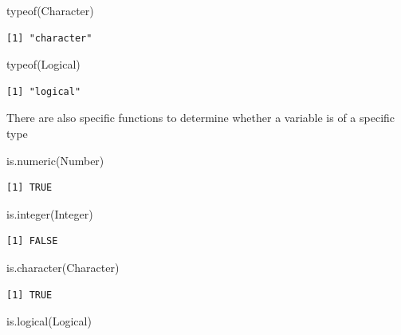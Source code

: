 \documentclass[
  letterpaper,
  DIV=11,
  numbers=noendperiod]{scrartcl}
\newenvironment{Shaded}{\begin{snugshade}}{\end{snugshade}}
\newcommand{\FunctionTok}[1]{\textcolor[rgb]{0.28,0.35,0.67}{#1}}
\newcommand{\NormalTok}[1]{\textcolor[rgb]{0.00,0.23,0.31}{#1}}
\begin{document}
\begin{Shaded}
\begin{Highlighting}[]
\FunctionTok{typeof}\NormalTok{(Character)}
\end{Highlighting}
\end{Shaded}

\begin{verbatim}
[1] "character"
\end{verbatim}

\begin{Shaded}
\begin{Highlighting}[]
\FunctionTok{typeof}\NormalTok{(Logical)}
\end{Highlighting}
\end{Shaded}

\begin{verbatim}
[1] "logical"
\end{verbatim}

There are also specific functions to determine whether a variable is of
a specific type

\begin{Shaded}
\begin{Highlighting}[]
\FunctionTok{is.numeric}\NormalTok{(Number)}
\end{Highlighting}
\end{Shaded}

\begin{verbatim}
[1] TRUE
\end{verbatim}

\begin{Shaded}
\begin{Highlighting}[]
\FunctionTok{is.integer}\NormalTok{(Integer) }
\end{Highlighting}
\end{Shaded}

\begin{verbatim}
[1] FALSE
\end{verbatim}

\begin{Shaded}
\begin{Highlighting}[]
\FunctionTok{is.character}\NormalTok{(Character)}
\end{Highlighting}
\end{Shaded}

\begin{verbatim}
[1] TRUE
\end{verbatim}

\begin{Shaded}
\begin{Highlighting}[]
\FunctionTok{is.logical}\NormalTok{(Logical)}
\end{Highlighting}
\end{Shaded}
\end{document}
